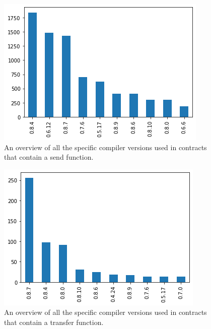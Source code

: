 \documentclass[10pt,conference]{IEEEtran}
\begin{document}
\begin{figure}[h]
  \centering
  \includegraphics[width=\linewidth]{img/sends_versions.png}
  \caption{An overview of all the specific compiler versions used in contracts that contain a send function. }
  \label{fig:send_version}
\end{figure}

\begin{figure}[h]
  \centering
  \includegraphics[width=\linewidth]{img/transfers_versions.png}
  \caption{An overview of all the specific compiler versions used in contracts that contain a transfer function. }
  \label{fig:transfer_version}
\end{figure}
\end{document}
